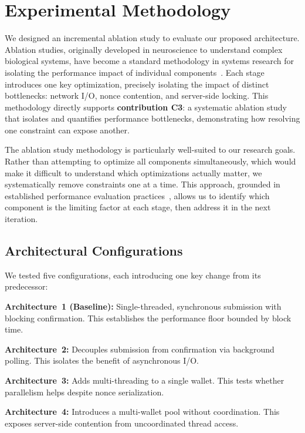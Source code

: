 \section{Experimental Methodology}
\label{sec:methodology}

We designed an incremental ablation study to evaluate our proposed architecture. Ablation studies, originally developed in neuroscience to understand complex biological systems, have become a standard methodology in systems research for isolating the performance impact of individual components~\cite{meyes2019ablation}. Each stage introduces one key optimization, precisely isolating the impact of distinct bottlenecks: network I/O, nonce contention, and server-side locking. This methodology directly supports \textbf{contribution C3}: a systematic ablation study that isolates and quantifies performance bottlenecks, demonstrating how resolving one constraint can expose another.

The ablation study methodology is particularly well-suited to our research goals. Rather than attempting to optimize all components simultaneously, which would make it difficult to understand which optimizations actually matter, we systematically remove constraints one at a time. This approach, grounded in established performance evaluation practices~\cite{john2007performance}, allows us to identify which component is the limiting factor at each stage, then address it in the next iteration.

\subsection{Architectural Configurations}

We tested five configurations, each introducing one key change from its predecessor:

\textbf{Architecture~1 (Baseline):} Single-threaded, synchronous submission with blocking confirmation. This establishes the performance floor bounded by block time.

\textbf{Architecture~2:} Decouples submission from confirmation via background polling. This isolates the benefit of asynchronous I/O.

\textbf{Architecture~3:} Adds multi-threading to a single wallet. This tests whether parallelism helps despite nonce serialization.

\textbf{Architecture~4:} Introduces a multi-wallet pool without coordination. This exposes server-side contention from uncoordinated thread access.

